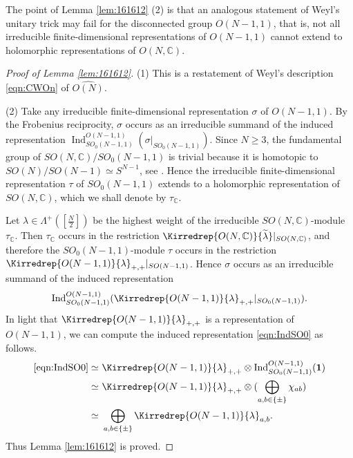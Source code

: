The point of Lemma \ref{lem:161612} (2) is 
 that an analogous statement of Weyl's unitary trick may fail
 for the disconnected group $O(N-1,1)$, 
 that is, 
 not all irreducible finite-dimensional representations
 of $O(N-1,1)$ cannot extend to holomorphic representations
 of $O(N, {\mathbb{C}})$.  
\begin{proof}
[Proof of Lemma \ref{lem:161612}]
(1)\enspace
This is a restatement of Weyl's description \eqref{eqn:CWOn}
 of $\widehat{O(N)}$.  
\par\noindent
(2)\enspace
Take any irreducible finite-dimensional representation
 $\sigma$ of $O(N-1,1)$.  
By the Frobenius reciprocity,
 $\sigma$ occurs as an irreducible summand of the induced representation 
 ${\operatorname{Ind}}_{SO_0(N-1,1)}^{O(N-1,1)}(\sigma|_{SO_0(N-1,1)})$.  
Since $N \ge 3$, 
 the fundamental group of $SO(N,{\mathbb{C}})/SO_0(N-1,1)$ is trivial
 because it is homotopic to 
 $SO(N)/SO(N-1) \simeq S^{N-1}$, 
 see \cite[Lem.~6.1]{xkpro89}.  
Hence the irreducible finite-dimensional representation $\tau$
 of $SO_0(N-1,1)$ extends to a holomorphic representation 
 of $SO(N,{\mathbb{C}})$, 
 which we shall denote by $\tau_{\mathbb{C}}$.  



Let $\lambda \in \Lambda^+([\frac N 2])$ be the highest weight
 of the irreducible $SO(N,{\mathbb{C}})$-module $\tau_{\mathbb{C}}$.  
Then $\tau_{\mathbb{C}}$ occurs in the restriction 
 $\Kirredrep {O(N,{\mathbb{C}})} {\widetilde \lambda}|_{SO(N,{\mathbb{C}})}$, 
 and therefore the $SO_0(N-1,1)$-module $\tau$ occurs 
 in the restriction 
 ${\Kirredrep{O(N-1,1)}{\lambda}}_{+,+}|_{SO(N-1,1)}$.  
Hence $\sigma$ occurs as an irreducible summand of the induced representation
\begin{equation}
\label{eqn:IndSO0}
{\operatorname{Ind}}_{SO_0(N-1,1)}^{O(N-1,1)}
({\Kirredrep{O(N-1,1)}{\lambda}}_{+,+}|_{SO_0(N-1,1)}).  
\end{equation}
In light that ${\Kirredrep{O(N-1,1)}{\lambda}}_{+,+}$ is a representation
 of $O(N-1,1)$, 
 we can compute the induced representation \eqref{eqn:IndSO0}
 as follows.  
\begin{align*}
\text{\eqref{eqn:IndSO0}}
\simeq\,\, & {\Kirredrep{O(N-1,1)}{\lambda}}_{+,+} 
         \otimes {\operatorname{Ind}}_{SO_0(N-1,1)}^{O(N-1,1)}({\bf{1}})
\\
\simeq\,\, &{\Kirredrep{O(N-1,1)}{\lambda}}_{+,+} 
         \otimes (\bigoplus_{a, b \in \{\pm\}} \chi_{a b})
\\
\simeq\,\, & \bigoplus_{a,b \in \{\pm\}}{\Kirredrep{O(N-1,1)}{\lambda}}_{a,b}.  
\end{align*}
Thus Lemma \ref{lem:161612} is proved.  
\end{proof}
